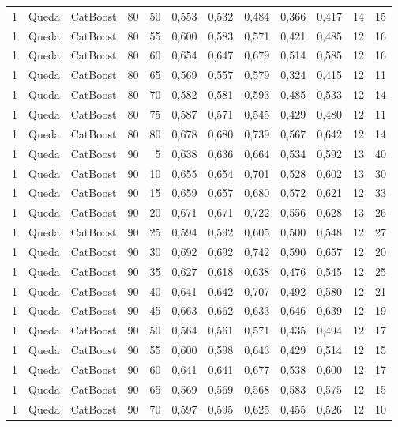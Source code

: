 \begin{longtable}{@{}rllrrrrrrrrr@{}}
1 & Queda & CatBoost & 80 & 50 & 0,553 & 0,532 & 0,484 & 0,366 & 0,417 & 14 & 15 \\
1 & Queda & CatBoost & 80 & 55 & 0,600 & 0,583 & 0,571 & 0,421 & 0,485 & 12 & 16 \\
1 & Queda & CatBoost & 80 & 60 & 0,654 & 0,647 & 0,679 & 0,514 & 0,585 & 12 & 16 \\
1 & Queda & CatBoost & 80 & 65 & 0,569 & 0,557 & 0,579 & 0,324 & 0,415 & 12 & 11 \\
1 & Queda & CatBoost & 80 & 70 & 0,582 & 0,581 & 0,593 & 0,485 & 0,533 & 12 & 14 \\
1 & Queda & CatBoost & 80 & 75 & 0,587 & 0,571 & 0,545 & 0,429 & 0,480 & 12 & 11 \\
1 & Queda & CatBoost & 80 & 80 & 0,678 & 0,680 & 0,739 & 0,567 & 0,642 & 12 & 14 \\
1 & Queda & CatBoost & 90 & 5 & 0,638 & 0,636 & 0,664 & 0,534 & 0,592 & 13 & 40 \\
1 & Queda & CatBoost & 90 & 10 & 0,655 & 0,654 & 0,701 & 0,528 & 0,602 & 13 & 30 \\
1 & Queda & CatBoost & 90 & 15 & 0,659 & 0,657 & 0,680 & 0,572 & 0,621 & 12 & 33 \\
1 & Queda & CatBoost & 90 & 20 & 0,671 & 0,671 & 0,722 & 0,556 & 0,628 & 13 & 26 \\
1 & Queda & CatBoost & 90 & 25 & 0,594 & 0,592 & 0,605 & 0,500 & 0,548 & 12 & 27 \\
1 & Queda & CatBoost & 90 & 30 & 0,692 & 0,692 & 0,742 & 0,590 & 0,657 & 12 & 20 \\
1 & Queda & CatBoost & 90 & 35 & 0,627 & 0,618 & 0,638 & 0,476 & 0,545 & 12 & 25 \\
1 & Queda & CatBoost & 90 & 40 & 0,641 & 0,642 & 0,707 & 0,492 & 0,580 & 12 & 21 \\
1 & Queda & CatBoost & 90 & 45 & 0,663 & 0,662 & 0,633 & 0,646 & 0,639 & 12 & 19 \\
1 & Queda & CatBoost & 90 & 50 & 0,564 & 0,561 & 0,571 & 0,435 & 0,494 & 12 & 17 \\
1 & Queda & CatBoost & 90 & 55 & 0,600 & 0,598 & 0,643 & 0,429 & 0,514 & 12 & 15 \\
1 & Queda & CatBoost & 90 & 60 & 0,641 & 0,641 & 0,677 & 0,538 & 0,600 & 12 & 17 \\
1 & Queda & CatBoost & 90 & 65 & 0,569 & 0,569 & 0,568 & 0,583 & 0,575 & 12 & 15 \\
1 & Queda & CatBoost & 90 & 70 & 0,597 & 0,595 & 0,625 & 0,455 & 0,526 & 12 & 10 \\

\end{longtable}
